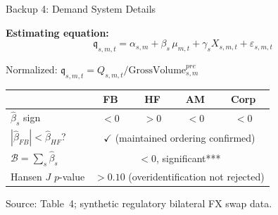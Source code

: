 \documentclass[aspectratio=169, 10pt]{beamer}
\newcommand{\calB}{\mathcal{B}}      %
\begin{document}
\begin{frame}{Backup 4: Demand System Details}

  \textbf{Estimating equation:}
  \[
    \mathfrak{q}_{s,m,t} = \alpha_{s,m} + \beta_s\,\mu_{m,t} +
    \gamma_s X_{s,m,t} + \varepsilon_{s,m,t}
  \]

  Normalized: $\mathfrak{q}_{s,m,t} = Q_{s,m,t} / \text{GrossVolume}_{s,m}^{pre}$

  \bigskip

  \begin{center}
  \begin{tabular}{lcccc}
    \toprule
    & FB & HF & AM & Corp \\
    \midrule
    $\hat\beta_s$ sign & $<0$ & $>0$ & $<0$ & $<0$ \\
    $|\hat\beta_{FB}| < \hat\beta_{HF}$? & \multicolumn{4}{c}{$\checkmark$ (maintained ordering confirmed)} \\
    \midrule
    $\calB = \sum_s \hat\beta_s$ & \multicolumn{4}{c}{$< 0$, significant***} \\
    Hansen $J$ $p$-value & \multicolumn{4}{c}{$> 0.10$ (overidentification not rejected)} \\
    \bottomrule
  \end{tabular}
  \end{center}

  {\color{dimgray}\small Source: Table~4; synthetic regulatory bilateral FX swap data.}

\end{frame}
\end{document}
